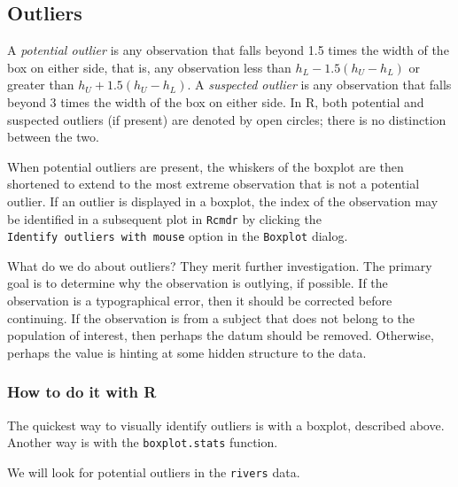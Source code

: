 \documentclass[]{book}
\newenvironment{Shaded}{\begin{snugshade}}{\end{snugshade}}
\newcommand{\KeywordTok}[1]{\textcolor[rgb]{0.13,0.29,0.53}{\textbf{{#1}}}}
\newcommand{\NormalTok}[1]{{#1}}
\numberwithin{equation}{chapter}
\numberwithin{figure}{chapter}
\theoremstyle{plain}
\theoremstyle{definition}
\theoremstyle{remark}
\theoremstyle{definition}
\theoremstyle{definition}
\theoremstyle{remark}
\let\BeginKnitrBlock\begin \let\EndKnitrBlock\end
\begin{document}
\subsection{Outliers}\label{sub-outliers}

A \emph{potential outlier} is any observation that falls beyond 1.5
times the width of the box on either side, that is, any observation less
than \(h_{L}-1.5(h_{U}-h_{L})\) or greater than
\(h_{U}+1.5(h_{U}-h_{L})\). A \emph{suspected outlier} is any
observation that falls beyond 3 times the width of the box on either
side. In R, both potential and suspected outliers (if present) are
denoted by open circles; there is no distinction between the two.

When potential outliers are present, the whiskers of the boxplot are
then shortened to extend to the most extreme observation that is not a
potential outlier. If an outlier is displayed in a boxplot, the index of
the observation may be identified in a subsequent plot in \texttt{Rcmdr}
by clicking the \texttt{Identify\ outliers\ with\ mouse} option in the
\texttt{Boxplot} dialog.

What do we do about outliers? They merit further investigation. The
primary goal is to determine why the observation is outlying, if
possible. If the observation is a typographical error, then it should be
corrected before continuing. If the observation is from a subject that
does not belong to the population of interest, then perhaps the datum
should be removed. Otherwise, perhaps the value is hinting at some
hidden structure to the data.

\subsubsection{How to do it with R}\label{how-to-do-it-with-r-6}

The quickest way to visually identify outliers is with a boxplot,
described above. Another way is with the \texttt{boxplot.stats}
function.

\bigskip

\BeginKnitrBlock{example}[Lengths of Major North American Rivers]
\protect\hypertarget{ex:unnamed-chunk-62}{}{\label{ex:unnamed-chunk-62}
\iffalse (Lengths of Major North American Rivers) \fi }We will look for
potential outliers in the \texttt{rivers} data.
\EndKnitrBlock{example}

\begin{Shaded}
\end{Shaded}
\end{document}
